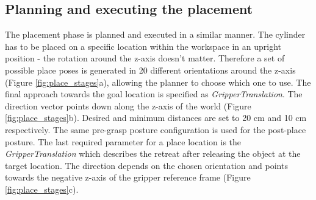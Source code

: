

\subsection{Planning and executing the placement}

The placement phase is planned and executed in a similar manner. The cylinder has to be placed on a specific location within the workspace in an upright position - the rotation around the z-axis doesn't matter. Therefore a set of possible place poses is generated in 20 different orientations around the z-axis (Figure \ref{fig:place_stages}a), allowing the planner to choose which one to use. The final approach towards the goal location is specified as \emph{GripperTranslation}. The direction vector points down along the z-axis of the world (Figure \ref{fig:place_stages}b). Desired and minimum distances are set to 20 cm and 10 cm respectively. The same pre-grasp posture configuration is used for the post-place posture. The last required parameter for a place location is the \emph{GripperTranslation} which describes the retreat after releasing the object at the target location. The direction depends on the chosen orientation and points towards the negative z-axis of the gripper reference frame (Figure \ref{fig:place_stages}c). 

